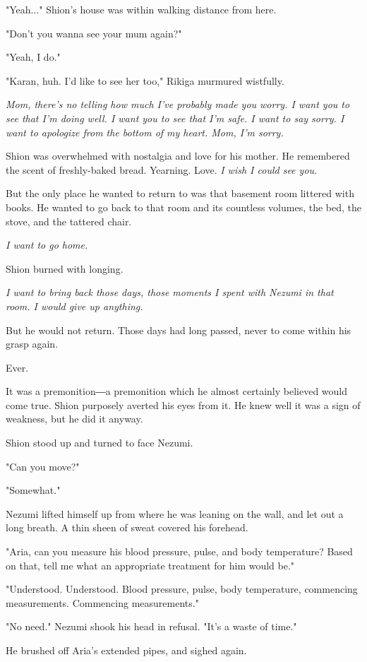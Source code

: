 "Yeah..." Shion's house was within walking distance from here.

"Don't you wanna see your mum again?"

"Yeah, I do."

"Karan, huh. I'd like to see her too," Rikiga murmured wistfully.

\emph{Mom, there's no telling how much I've probably made you worry. I want
you to see that I'm doing well. I want you to see that I'm safe. I want
to say sorry. I want to apologize from the bottom of my heart. Mom, I'm
sorry.}

Shion was overwhelmed with nostalgia and love for his mother. He
remembered the scent of freshly-baked bread. Yearning. Love. \emph{I wish I
could see you.}

But the only place he wanted to return to was that basement room
littered with books. He wanted to go back to that room and its countless
volumes, the bed, the stove, and the tattered chair.

\emph{I want to go home.}

Shion burned with longing.

\emph{I want to bring back those days, those moments I spent with Nezumi in
that room. I would give up anything.}

But he would not return. Those days had long passed, never to come
within his grasp again.

Ever.

It was a premonition―a premonition which he almost certainly believed
would come true. Shion purposely averted his eyes from it. He knew well
it was a sign of weakness, but he did it anyway.

Shion stood up and turned to face Nezumi.

"Can you move?"

"Somewhat."

Nezumi lifted himself up from where he was leaning on the wall, and let
out a long breath. A thin sheen of sweat covered his forehead.

"Aria, can you measure his blood pressure, pulse, and body temperature?
Based on that, tell me what an appropriate treatment for him would be."

{\sffamily "Understood. Understood. Blood pressure, pulse, body temperature,
commencing measurements. Commencing measurements."}

"No need." Nezumi shook his head in refusal. "It's a waste of time."

He brushed off Aria's extended pipes, and sighed again.

